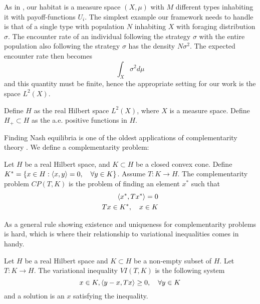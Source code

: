 As in , our habitat is a measure space $(X,\mu)$ with $M$ different types inhabiting it with payoff-functions $U_i$. The simplest example our framework needs to handle is that of a single type with population $N$ inhabiting $X$ with foraging distribution $\sigma$. The encounter rate of an individual following the strategy $\sigma$ with the entire population also following the strategy $\sigma$ has the density $N\sigma^2$. The expected encounter rate then becomes
\begin{equation}
  \int_X \sigma^2 d\mu
\end{equation}
and this quantity must be finite, hence the appropriate setting for our work is the space $L^2(X)$.
\begin{definition}
  Define $H$ as the real Hilbert space $L^2(X)$, where $X$ is a measure space. Define $H_+ \subset H$ as the a.e. positive functions in $H$.
\end{definition}
Finding Nash equilibria is one of the oldest applications of complementarity theory \citep{karamardian1969nonlinear}. We define a complementarity problem:
\begin{definition}
  Let $H$ be a real Hilbert space, and $K \subset H$ be a closed convex cone. Define $K^* = \{ x \in H : \left \langle x,y \right \rangle = 0, \quad \forall y\in K\} $. Assume $T:K \to H$. The complementarity problem $CP(T,K)$ is the problem of finding an element $x^*$ such that
  \begin{equation}
    \begin{split}
    \left \langle x^*,Tx^* \right \rangle = 0 \\
    Tx \in K^*, \quad  x\in K
  \end{split}
  \end{equation}
\end{definition}
As a general rule showing existence and uniqueness for complementarity problems is hard, which is where their relationship to variational inequalities comes in handy.
\begin{definition}
  Let $H$ be a real Hilbert space and $K\subset H$ be a non-empty subset of $H$. Let $T: K \to H$. The variational inequality $VI(T,K)$ is the following system
  \begin{equation}
    x \in K, \left \langle y-x,Tx \right \rangle \geq 0, \quad \forall y \in K
  \end{equation}
  and a solution is an $x$ satisfying the inequality.
\end{definition}

